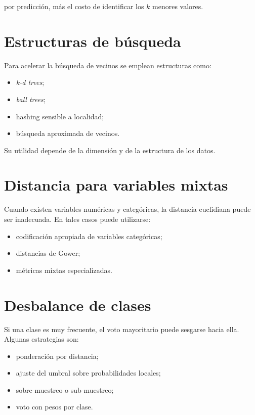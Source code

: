 \documentclass[
  spanish,
  11pt,
  letterpaper,
  DIV=11,
  numbers=noendperiod]{scrreprt}
\providecommand{\tightlist}{%
  \setlength{\itemsep}{0pt}\setlength{\parskip}{0pt}}
\theoremstyle{definition}
\theoremstyle{plain}
\theoremstyle{definition}
\theoremstyle{remark}
\begin{document}
por predicción, más el costo de identificar los \(k\) menores valores.

\section{Estructuras de búsqueda}\label{estructuras-de-buxfasqueda}

Para acelerar la búsqueda de vecinos se emplean estructuras como:

\begin{itemize}
\tightlist
\item
  \emph{k-d trees};
\item
  \emph{ball trees};
\item
  hashing sensible a localidad;
\item
  búsqueda aproximada de vecinos.
\end{itemize}

Su utilidad depende de la dimensión y de la estructura de los datos.

\section{Distancia para variables
mixtas}\label{distancia-para-variables-mixtas}

Cuando existen variables numéricas y categóricas, la distancia
euclidiana puede ser inadecuada. En tales casos puede utilizarse:

\begin{itemize}
\tightlist
\item
  codificación apropiada de variables categóricas;
\item
  distancias de Gower;
\item
  métricas mixtas especializadas.
\end{itemize}

\section{Desbalance de clases}\label{desbalance-de-clases}

Si una clase es muy frecuente, el voto mayoritario puede sesgarse hacia
ella. Algunas estrategias son:

\begin{itemize}
\tightlist
\item
  ponderación por distancia;
\item
  ajuste del umbral sobre probabilidades locales;
\item
  sobre-muestreo o sub-muestreo;
\item
  voto con pesos por clase.
\end{itemize}
\end{document}
